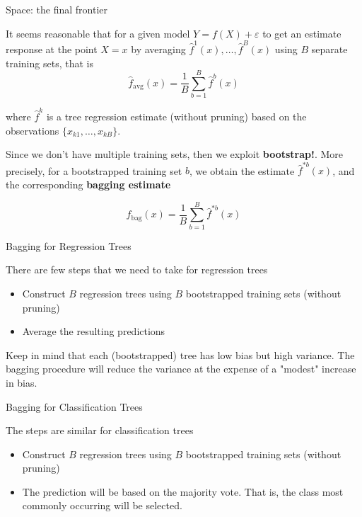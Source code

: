 \documentclass{beamer}
\begin{document}
	\begin{frame}{Space: the final frontier}
		
		It seems reasonable that for a given model $Y=f(X)+\varepsilon$ to get an estimate response at the point $X=x$ by averaging $\hat{f}^1(x), \ldots, \hat{f}^B(x)$ using $B$ separate training sets, that is 
		\begin{equation*}
			\hat{f}_{\textrm{avg}}(x)= \frac{1}{B} \sum_{b=1}^B \hat{f}^b (x)
		\end{equation*}
		
		where $\hat{f}^k$ is a tree regression estimate (without pruning) based on the observations $\{x_{k1},\ldots,x_{kB}\}$.
		
		Since we don't have multiple training sets, then we exploit {\bf bootstrap!}.  More precisely, for a bootstrapped training set $b$, we obtain the estimate $\hat{f}^{*b}(x)$, and the corresponding {\bf bagging estimate}
		
		\begin{equation*}
			\hat{f}_{\textrm{bag}}(x)= \frac{1}{B} \sum_{b=1}^B \hat{f}^{*b} (x)
		\end{equation*}
		
	\end{frame}
	
	
	
	
	
	
	\begin{frame}{Bagging for Regression Trees}
		
		There are few steps that we need to take for regression trees
		\begin{itemize}
			\item Construct $B$ regression trees using $B$ bootstrapped training sets (without pruning)
			\item Average the resulting predictions
		\end{itemize}
		Keep in mind that each (bootstrapped) tree has low bias but high variance. The bagging procedure will reduce the variance at the expense of a "modest" increase in bias. 
	\end{frame}
	
	\begin{frame}{Bagging for Classification Trees}
		
		The steps are similar for classification trees
		\begin{itemize}
			\item Construct $B$ regression trees using $B$ bootstrapped training sets (without pruning)
			\item The prediction will be based on the majority vote. That is, the class most commonly occurring will be selected.
		\end{itemize}
		
	\end{frame}
	
\end{document}
